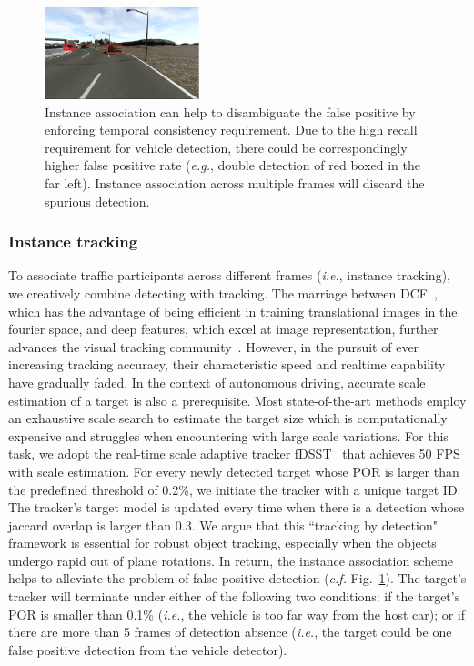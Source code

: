 \documentclass[10pt,twocolumn,letterpaper]{article}
\begin{document}
\begin{figure}[t]
        \centering
        \includegraphics[width=0.4\textwidth]{figures/double_detection.png}
        \caption{Instance association can help to disambiguate the false positive by enforcing temporal consistency requirement. Due to the high recall requirement for vehicle detection, there could be correspondingly higher false positive rate (\emph{e.g.}, double detection of red boxed in the far left). Instance association across multiple frames will discard the spurious detection.}
        \label{fig:Instance_association}
\end{figure}



\subsubsection{Instance tracking}

To associate traffic participants across different frames (\emph{i.e.}, instance tracking), we creatively combine detecting with tracking.
The marriage between DCF~\cite{henriques2015high}, which has the advantage of being efficient in training translational images in the fourier space, and deep features, which excel at image representation, further advances the visual tracking community~\cite{qi2016hedged, danelljan2016eccv, wu2017kernalised, danelljan2017eco}. However, in the pursuit of ever increasing tracking accuracy, their characteristic speed and realtime capability have gradually faded. In the context of autonomous driving, accurate scale estimation of a target is also a prerequisite. Most state-of-the-art methods employ an exhaustive scale search to estimate the target size which is computationally expensive and struggles when encountering with large scale variations.
For this task, we adopt the real-time scale adaptive tracker fDSST~\cite{danelljan2017discriminative} that achieves 50 FPS with scale estimation.
For every newly detected target whose POR is larger than the predefined threshold of 0.2\%, we initiate the tracker with a unique target ID. The tracker's target model is updated every time when there is a detection whose jaccard overlap is larger than 0.3. We argue that this ``tracking by detection" framework is essential for robust object tracking, especially when the objects undergo rapid out of plane rotations. In return, the instance association scheme helps to alleviate the problem of false positive detection (\emph{c.f.} Fig.~\ref{fig:Instance_association}).
The target's tracker will terminate under either of the following two conditions: if the target's POR is smaller than 0.1\% (\emph{i.e.}, the vehicle is too far way from the host car); or if there are more than 5 frames of detection absence  (\emph{i.e.}, the target could be one false positive detection from the vehicle detector).
\end{document}
